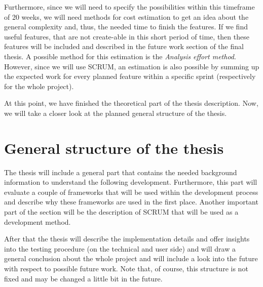 \documentclass[a4page]{article}
\begin{document}
Furthermore, since we will need to specify the possibilities within this timeframe of 20 weeks, we will need methods for cost estimation to get an idea about the general complexity and, thus, the needed time to finish the features. If we find useful features, that are not create-able in this short period of time, then these features will be included and described in the future work section of the final thesis. A possible method for this estimation is the \textit{Analysis effort method}. However, since we will use SCRUM, an estimation is also possible by summing up the expected work for every planned feature within a specific sprint (respectively for the whole project).

At this point, we have finished the theoretical part of the thesis description. Now, we will take a closer look at the planned general structure of the thesis.

\section{General structure of the thesis}
The thesis will include a general part that contains the needed background information to understand the following development. Furthermore, this part will evaluate a couple of frameworks that will be used within the development process and describe why these frameworks are used in the first place. Another important part of the section will be the description of SCRUM that will be used as a development method.  

After that the thesis will describe the implementation details and offer insights into the testing procedure (on the technical and user side) and will draw a general conclusion about the whole project and will include a look into the future with respect to possible future work. Note that, of course, this structure is not fixed and may be changed a little bit in the future. \\
\end{document}
